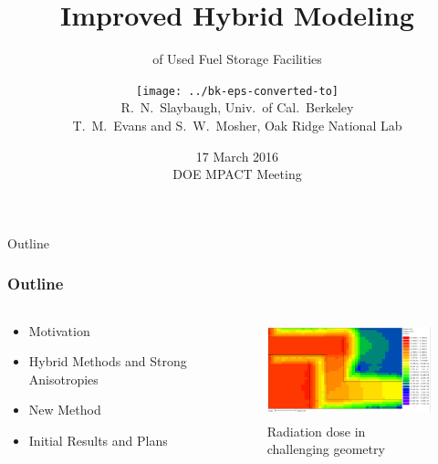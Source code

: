 \documentclass[handout]{beamer}
\title{Improved Hybrid Modeling}
\subtitle{of Used Fuel Storage Facilities}
\author{\texttt{[image: ../bk-eps-converted-to]}\\R.\ N.\ Slaybaugh, Univ.\ of Cal.\ Berkeley\\[1ex]
T.\ M.\ Evans and S.\ W.\ Mosher, Oak Ridge National Lab}
\date{17 March 2016 \\ DOE MPACT Meeting}
\renewcommand{\(}{\begin{columns}}
\renewcommand{\)}{\end{columns}}
\newcommand{\<}[1]{\begin{column}{#1}}
\renewcommand{\>}{\end{column}}
\begin{document}
\begin{frame}
\titlepage
\end{frame}

\begin{frame}[fragile]{Outline}
  \frametitle{Outline}

\begin{columns}
  \begin{column}{0.5\textwidth}
    \begin{itemize}
    \item Motivation
    \vspace*{.75em}
    \item Hybrid Methods and Strong Anisotropies
    \vspace*{.75em}
	\item New Method
    \vspace*{.75em}
	\item Initial Results and Plans
  \end{itemize}
  \end{column}
  \begin{column}{0.5\textwidth}
  	\begin{figure}
  	\begin{center}
  		\includegraphics[height=1.1in,clip]{../figs/labyrinth-dr}
		\caption{Radiation dose in challenging geometry}
	\end{center}
  	\end{figure}
  \end{column}
\end{columns}

\end{frame}


\end{document}
